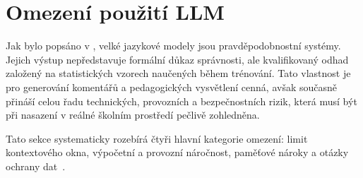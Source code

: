 \section{Omezení použití LLM}
\label{sec:llm-limitations}

Jak bylo popsáno v , velké jazykové modely jsou pravděpodobnostní systémy.
Jejich výstup nepředstavuje formální důkaz správnosti, ale kvalifikovaný odhad založený na statistických vzorech naučených během trénování.
Tato vlastnost je pro generování komentářů a pedagogických vysvětlení cenná, avšak současně přináší celou řadu technických, provozních a bezpečnostních rizik, která musí být při nasazení v reálné školním prostředí pečlivě zohledněna.

Tato sekce systematicky rozebírá čtyři hlavní kategorie omezení: limit kontextového okna, výpočetní a provozní náročnost, paměťové nároky a otázky ochrany dat~\cite{ibm-llmlimitations}.







\endinput
